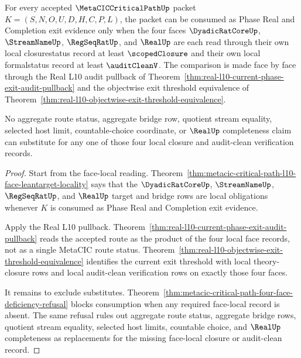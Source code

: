 \begin{theorem}
\label{thm:metacic-critical-path-phase-real-audit-clean-floor}
For every accepted $\MetaCICCriticalPathUp$ packet $K=(S,N,O,U,D,H,C,P,L)$, the packet can be consumed as Phase Real and Completion exit evidence only when the four faces $\DyadicRatCoreUp$, $\StreamNameUp$, $\RegSeqRatUp$, and $\RealUp$ are each read through their own local closurestatus record at least $\scopedClosure$ and their own local formalstatus record at least $\auditCleanV$. The comparison is made face by face through the Real L10 audit pullback of Theorem~\ref{thm:real-l10-current-phase-exit-audit-pullback} and the objectwise exit threshold equivalence of Theorem~\ref{thm:real-l10-objectwise-exit-threshold-equivalence}.

No aggregate route status, aggregate bridge row, quotient stream equality, selected host limit, countable-choice coordinate, or $\RealUp$ completeness claim can substitute for any one of those four local closure and audit-clean verification records.
\end{theorem}
\begin{proof}
Start from the face-local reading. Theorem~\ref{thm:metacic-critical-path-l10-face-leantarget-locality} says that the $\DyadicRatCoreUp$, $\StreamNameUp$, $\RegSeqRatUp$, and $\RealUp$ target and bridge rows are local obligations whenever $K$ is consumed as Phase Real and Completion exit evidence.

Apply the Real L10 pullback. Theorem~\ref{thm:real-l10-current-phase-exit-audit-pullback} reads the accepted route as the product of the four local face records, not as a single MetaCIC route status. Theorem~\ref{thm:real-l10-objectwise-exit-threshold-equivalence} identifies the current exit threshold with local theory-closure rows and local audit-clean verification rows on exactly those four faces.

It remains to exclude substitutes. Theorem~\ref{thm:metacic-critical-path-four-face-deficiency-refusal} blocks consumption when any required face-local record is absent. The same refusal rules out aggregate route status, aggregate bridge rows, quotient stream equality, selected host limits, countable choice, and $\RealUp$ completeness as replacements for the missing face-local closure or audit-clean record.
\end{proof}

